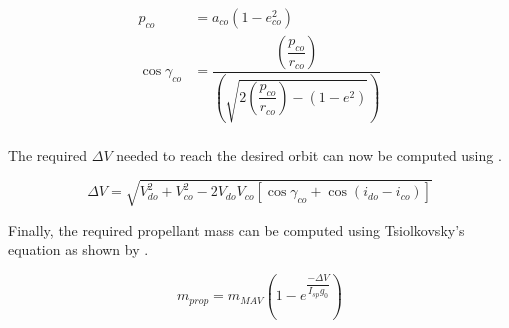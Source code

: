 \begin{equation}\label{eq:cosFPA}
\begin{split}
p_{co}&=a_{co}\left(1-e_{co}^{2}\right)\\
\cos \gamma_{co}&=\dfrac{\left(\dfrac{p_{co}}{r_{co}}\right)}{\left(\sqrt{2\left(\dfrac{p_{co}}{r_{co}}\right)-\left(1-e^{2}\right)}\right)}\\
\end{split}
\end{equation}

\noindent
The required $\Delta V$ needed to reach the desired orbit can now be computed using .

\begin{equation} \label{eq:requiredDeltaV}
\Delta V = \sqrt{V_{do}^{2}+V_{co}^{2}-2V_{do}V_{co}\left[\cos \gamma_{co}+\cos\left(i_{do}-i_{co}\right)\right]}
\end{equation}


\noindent
Finally, the required propellant mass can be computed using Tsiolkovsky's equation as shown by .

\begin{equation} \label{eq:propellantMass}
m_{prop} = m_{MAV}\left(1-e^{\dfrac{-\Delta V}{I_{sp}g_{0}}}\right)
\end{equation}

%

%

